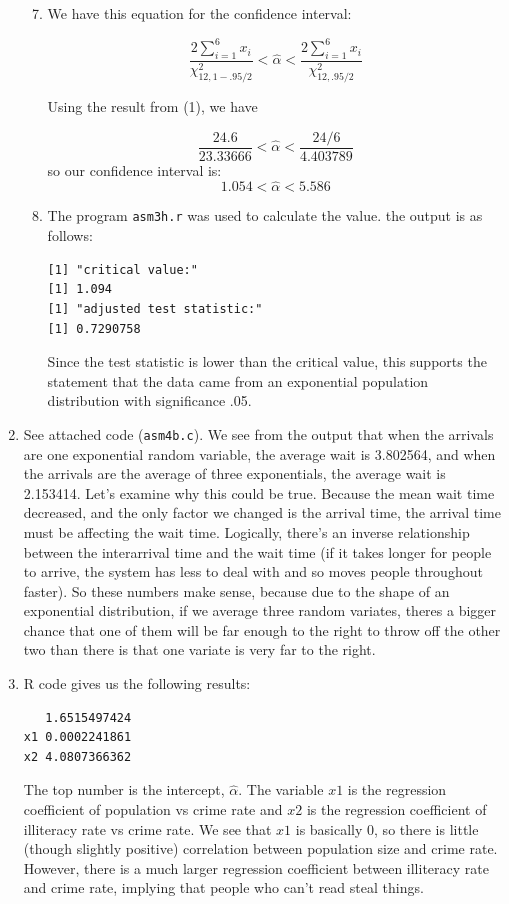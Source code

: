 \documentclass[11pt]{article} %
\begin{document}
\begin{enumerate}
\begin{enumerate}
\setcounter{enumii}{6}
\item We have this equation for the confidence interval:

$$\frac{2\sum_{i = 1}^6x_i}{\chi^2_{12, 1 - .95/2}} < \hat{\alpha} < \frac{2\sum_{i = 1}^6x_i}{\chi^2_{12, .95/2}}$$

Using the result from (1), we have

$$\frac{24.6}{23.33666} < \hat{\alpha} < \frac{24/6}{4.403789}$$
so our confidence interval is:
$$1.054 < \hat{\alpha} < 5.586$$

\item The program \texttt{asm3h.r} was used to calculate the value.  the output is as follows:
\begin{verbatim}[1] "critical value:"
[1] 1.094
[1] "adjusted test statistic:"
[1] 0.7290758\end{verbatim}

Since the test statistic is lower than the critical value, this supports the statement that the data came from an exponential population distribution with significance .05.

\end{enumerate}

\item See attached code (\texttt{asm4b.c}).  We see from the output that when the arrivals are one exponential random variable, the average wait is 3.802564, and when the arrivals are the average of three exponentials, the average wait is 2.153414.  Let's examine why this could be true.  Because the mean wait time decreased, and the only factor we changed is the arrival time, the arrival time must be affecting the wait time.  Logically, there's an inverse relationship between the interarrival time and the wait time (if it takes longer for people to arrive, the system has less to deal with and so moves people throughout faster).  So these numbers make sense, because due to the shape of an exponential distribution, if we average three random variates, theres a bigger chance that one of them will be far enough to the right to throw off the other two than there is that one variate is very far to the right.

\item R code gives us the following results:
\begin{verbatim}   1.6515497424
x1 0.0002241861
x2 4.0807366362\end{verbatim}

The top number is the intercept, $\hat{\alpha}$. The variable $x1$ is the regression coefficient of population vs crime rate and $x2$ is the regression coefficient of illiteracy rate vs crime rate.  We see that $x1$ is basically 0, so there is little (though slightly positive) correlation between population size and crime rate.  However, there is a much larger regression coefficient between illiteracy rate and crime rate, implying that people who can't read steal things.

\end{enumerate}
\end{document}
